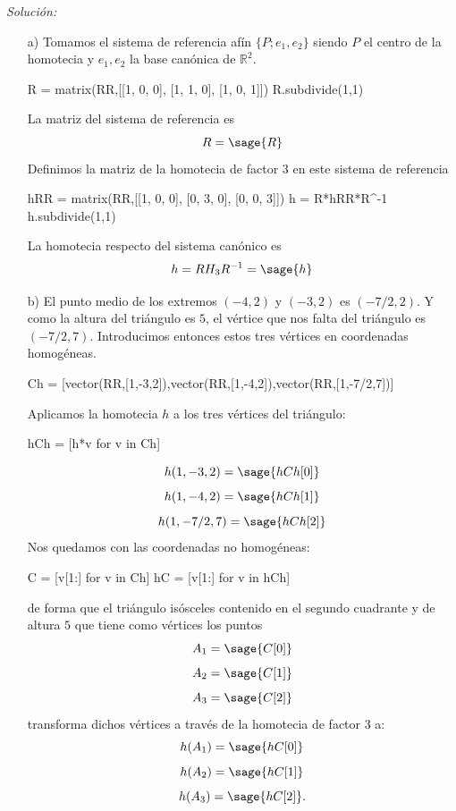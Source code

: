 \documentclass{amsart}
\begin{document}
{\it Solución:}

\begin{enumerate}
\item[a)] Tomamos el sistema de referencia afín $\{P;e_1,e_2\}$ siendo $P$ el centro de la homotecia y $e_1,e_2$ la base canónica de ${\mathbb R}^2$.

\begin{sageblock}
R = matrix(RR,[[1, 0, 0],
            [1, 1, 0],
            [1, 0, 1]])
R.subdivide(1,1)
\end{sageblock}

La matriz del sistema de referencia es \[R=\sage{R}\]
Definimos la matriz de la homotecia de factor $3$ en este sistema de referencia

\begin{sageblock}
hRR = matrix(RR,[[1, 0, 0],
              [0, 3, 0],
              [0, 0, 3]])
h = R*hRR*R^-1
h.subdivide(1,1)
\end{sageblock}

La homotecia respecto del sistema canónico es
\[ h = RH_3R^{-1}= \sage{h} \]

\item[b)]
El punto medio de los extremos $(-4,2)$ y $(-3,2)$ es $(-7/2,2)$. Y como la altura del triángulo es $5$, el vértice que nos falta del triángulo es $(-7/2,7)$. Introducimos entonces estos tres vértices en coordenadas homogéneas.

\begin{sageblock}
Ch = [vector(RR,[1,-3,2]),vector(RR,[1,-4,2]),vector(RR,[1,-7/2,7])]
\end{sageblock}
Aplicamos la homotecia $h$ a los tres vértices del triángulo:
\begin{sageblock}
hCh = [h*v for v in Ch]
\end{sageblock}
$$h(1,-3,2)=\sage{hCh[0]}$$
$$h(1,-4,2)=\sage{hCh[1]}$$
$$h(1,-7/2,7)=\sage{hCh[2]}$$
Nos quedamos con las coordenadas no homogéneas:
\begin{sageblock}
C = [v[1:] for v in Ch]
hC = [v[1:] for v in hCh]
\end{sageblock}
de forma que el triángulo isósceles contenido en el segundo cuadrante y de altura $5$ que tiene como vértices los puntos
\[ A_1 = \sage{C[0]}\] 
\[A_2 = \sage{C[1]}\] 
\[A_3 = \sage{C[2]}\]
transforma dichos vértices a través de la homotecia de factor $3$ a:
\[ h(A_1) = \sage{hC[0]}\] 
\[h(A_2) = \sage{hC[1]}\]  
\[h(A_3) = \sage{hC[2]}. \]


\end{enumerate}
\end{document}
